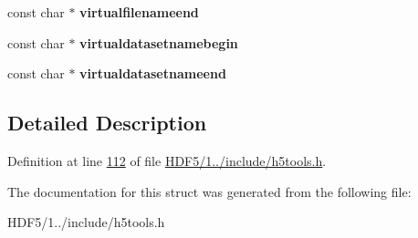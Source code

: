 \begin{DoxyCompactItemize}
const char $\ast$ {\bfseries virtualfilenameend}
\item 
\mbox{\label{structh5tools__dump__header__t_a4ddfe327fc4014b3db725eb10a6e0e51}} 
const char $\ast$ {\bfseries virtualdatasetnamebegin}
\item 
\mbox{\label{structh5tools__dump__header__t_ac801e813d535f9786df400d14375e639}} 
const char $\ast$ {\bfseries virtualdatasetnameend}
\end{DoxyCompactItemize}


\subsection{Detailed Description}


Definition at line \hyperlink{_h_d_f5_21_810_81_2include_2h5tools_8h_source_l00112}{112} of file \hyperlink{_h_d_f5_21_810_81_2include_2h5tools_8h_source}{H\+D\+F5/1../include/h5tools.\+h}.



The documentation for this struct was generated from the following file\+:\begin{DoxyCompactItemize}
\item 
H\+D\+F5/1../include/h5tools.\+h\end{DoxyCompactItemize}
